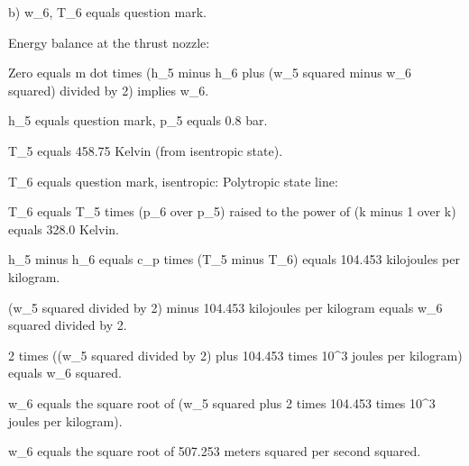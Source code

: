b) w_6, T_6 equals question mark.

Energy balance at the thrust nozzle:

Zero equals m dot times (h_5 minus h_6 plus (w_5 squared minus w_6 squared) divided by 2) implies w_6.

h_5 equals question mark, p_5 equals 0.8 bar.

T_5 equals 458.75 Kelvin (from isentropic state).

T_6 equals question mark, isentropic: Polytropic state line:

T_6 equals T_5 times (p_6 over p_5) raised to the power of (k minus 1 over k) equals 328.0 Kelvin.

h_5 minus h_6 equals c_p times (T_5 minus T_6) equals 104.453 kilojoules per kilogram.

(w_5 squared divided by 2) minus 104.453 kilojoules per kilogram equals w_6 squared divided by 2.

2 times ((w_5 squared divided by 2) plus 104.453 times 10^3 joules per kilogram) equals w_6 squared.

w_6 equals the square root of (w_5 squared plus 2 times 104.453 times 10^3 joules per kilogram).

w_6 equals the square root of 507.253 meters squared per second squared.